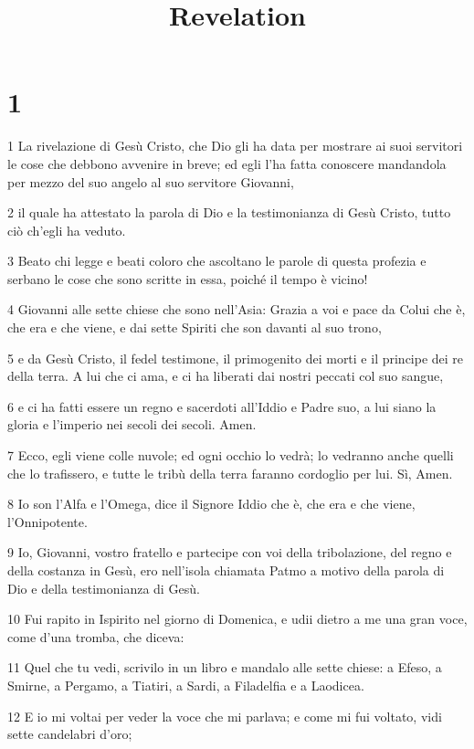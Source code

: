

\title{Revelation}


\chapter{1}

\par 1 La rivelazione di Gesù Cristo, che Dio gli ha data per mostrare ai suoi servitori le cose che debbono avvenire in breve; ed egli l'ha fatta conoscere mandandola per mezzo del suo angelo al suo servitore Giovanni,
\par 2 il quale ha attestato la parola di Dio e la testimonianza di Gesù Cristo, tutto ciò ch'egli ha veduto.
\par 3 Beato chi legge e beati coloro che ascoltano le parole di questa profezia e serbano le cose che sono scritte in essa, poiché il tempo è vicino!
\par 4 Giovanni alle sette chiese che sono nell'Asia: Grazia a voi e pace da Colui che è, che era e che viene, e dai sette Spiriti che son davanti al suo trono,
\par 5 e da Gesù Cristo, il fedel testimone, il primogenito dei morti e il principe dei re della terra. A lui che ci ama, e ci ha liberati dai nostri peccati col suo sangue,
\par 6 e ci ha fatti essere un regno e sacerdoti all'Iddio e Padre suo, a lui siano la gloria e l'imperio nei secoli dei secoli. Amen.
\par 7 Ecco, egli viene colle nuvole; ed ogni occhio lo vedrà; lo vedranno anche quelli che lo trafissero, e tutte le tribù della terra faranno cordoglio per lui. Sì, Amen.
\par 8 Io son l'Alfa e l'Omega, dice il Signore Iddio che è, che era e che viene, l'Onnipotente.
\par 9 Io, Giovanni, vostro fratello e partecipe con voi della tribolazione, del regno e della costanza in Gesù, ero nell'isola chiamata Patmo a motivo della parola di Dio e della testimonianza di Gesù.
\par 10 Fui rapito in Ispirito nel giorno di Domenica, e udii dietro a me una gran voce, come d'una tromba, che diceva:
\par 11 Quel che tu vedi, scrivilo in un libro e mandalo alle sette chiese: a Efeso, a Smirne, a Pergamo, a Tiatiri, a Sardi, a Filadelfia e a Laodicea.
\par 12 E io mi voltai per veder la voce che mi parlava; e come mi fui voltato, vidi sette candelabri d'oro;
